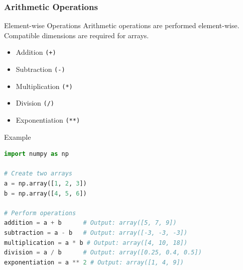 \documentclass{beamer}
\begin{document}
\begin{frame}[fragile]
    \frametitle{Arithmetic Operations}
    \begin{block}{Element-wise Operations}
        Arithmetic operations are performed element-wise. Compatible dimensions are required for arrays.
    \end{block}
    
    \begin{itemize}
        \item Addition \texttt{(+)}
        \item Subtraction \texttt{(-)}
        \item Multiplication \texttt{(*)}
        \item Division \texttt{(/)}
        \item Exponentiation \texttt{(**)}
    \end{itemize}
    
    \begin{block}{Example}
        \begin{lstlisting}[language=Python]
import numpy as np

# Create two arrays
a = np.array([1, 2, 3])
b = np.array([4, 5, 6])

# Perform operations
addition = a + b      # Output: array([5, 7, 9])
subtraction = a - b   # Output: array([-3, -3, -3])
multiplication = a * b # Output: array([4, 10, 18])
division = a / b      # Output: array([0.25, 0.4, 0.5])
exponentiation = a ** 2 # Output: array([1, 4, 9])
        \end{lstlisting}
    \end{block}
\end{frame}
\end{document}
